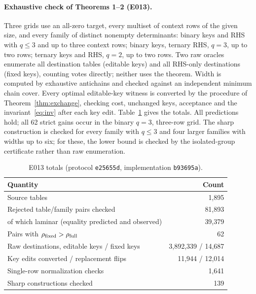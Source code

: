 \documentclass[11pt]{article}
\theoremstyle{remark}
\newcommand{\rfull}{\rho_{\rm full}}
\newcommand{\rfix}{\rho_{\rm fixed}}
\begin{document}
\paragraph{Exhaustive check of Theorems 1--2 (E013).}
Three grids use an all-zero target, every multiset of context rows of the
given size, and every family of distinct nonempty determinants: binary keys and
RHS with $q\le3$ and up to three context rows; binary keys, ternary RHS,
$q=3$, up to two rows; ternary keys and RHS, $q=2$, up to two rows. Two raw
oracles enumerate all destination tables (editable keys) and all RHS-only
destinations (fixed keys), counting votes directly; neither uses the theorem.
Width is computed by exhaustive antichains and checked against an independent
minimum chain cover. Every optimal editable-key witness is converted by the
procedure of Theorem~\ref{thm:exchange}, checking cost, unchanged keys,
acceptance and the invariant~\eqref{eq:inv} after each key edit.
Table~\ref{tab:e013} gives the totals. All predictions hold; all 62 strict
gains occur in the binary $q=3$, three-row grid. The sharp construction is
checked for every family with $q\le3$ and four larger families with widths up
to six; for these, the lower bound is checked by the isolated-group
certificate rather than raw enumeration.

\begin{table}[H]
\centering\small
\begin{tabular}{lr}
\toprule
Quantity & Count\\
\midrule
Source tables & 1,895\\
Rejected table/family pairs checked & 81,893\\
\quad of which laminar (equality predicted and observed) & 39,379\\
Pairs with $\rfix>\rfull$ & 62\\
Raw destinations, editable keys / fixed keys & 3,892,339 / 14,687\\
Key edits converted / replacement flips & 11,944 / 12,014\\
Single-row normalization checks & 1,641\\
Sharp constructions checked & 139\\
\bottomrule
\end{tabular}
\caption{E013 totals (protocol \texttt{e25655d}, implementation
\texttt{b93695a}).}\label{tab:e013}
\end{table}
\end{document}
